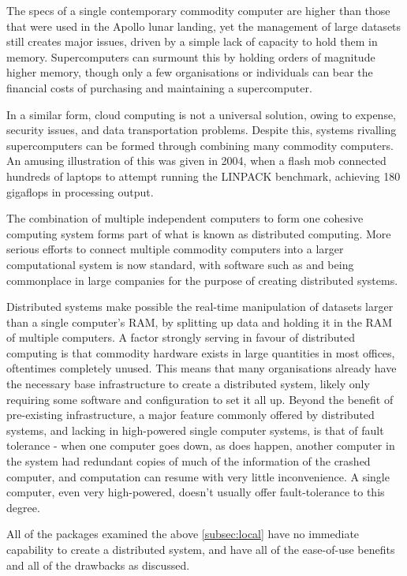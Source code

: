 
The specs of a single contemporary commodity computer are higher than
those that were used in the Apollo lunar landing, yet the management of
large datasets still creates major issues, driven by a simple lack of
capacity to hold them in memory. Supercomputers can surmount this by
holding orders of magnitude higher memory, though only a few
organisations or individuals can bear the financial costs of purchasing
and maintaining a supercomputer.

In a similar form, cloud computing is not a universal solution, owing to
expense, security issues, and data transportation problems. Despite
this, systems rivalling supercomputers can be formed through combining
many commodity computers. An amusing illustration of this was given in
2004, when a flash mob connected hundreds of laptops to attempt running
the LINPACK benchmark, achieving 180 gigaflops in processing
output\cite{perry2004flashcomp}.

The combination of multiple independent computers to form one cohesive
computing system forms part of what is known as distributed computing.
More serious efforts to connect multiple commodity computers into a
larger computational system is now standard, with software such as
 and  being commonplace in large companies for the purpose of
creating distributed systems.

Distributed systems make possible the real-time manipulation of datasets
larger than a single computer's RAM, by splitting up data and holding it
in the RAM of multiple computers. A factor strongly serving in favour of
distributed computing is that commodity hardware exists in large
quantities in most offices, oftentimes completely unused. This means
that many organisations already have the necessary base infrastructure
to create a distributed system, likely only requiring some software and
configuration to set it all up. Beyond the benefit of pre-existing
infrastructure, a major feature commonly offered by distributed systems,
and lacking in high-powered single computer systems, is that of fault
tolerance - when one computer goes down, as does happen, another
computer in the system had redundant copies of much of the information
of the crashed computer, and computation can resume with very little
inconvenience. A single computer, even very high-powered, doesn't
usually offer fault-tolerance to this degree.

All of the packages examined the above \cref{subsec:local} have no
immediate capability to create a distributed system, and have all of the
ease-of-use benefits and all of the drawbacks as discussed.

